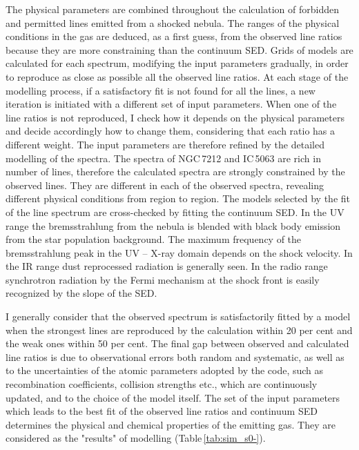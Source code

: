 \documentclass[../thesis.tex]{subfiles}
\begin{document}
The physical parameters are combined throughout the calculation of forbidden and permitted lines emitted from a shocked nebula.
The ranges of the physical conditions in the gas are deduced, as a first guess, from the observed line ratios because they are more constraining than the continuum SED.
Grids of models are calculated for each spectrum, modifying the input parameters gradually, in order to reproduce as close as possible all the observed line ratios.
At each stage of the modelling process, if a satisfactory fit is not found for all the lines, a new iteration is initiated with a different set of input parameters. 
When one of the line ratios is not reproduced, I check how it depends on the physical parameters and decide accordingly how to change them, considering that each ratio has a different weight.
The input parameters are therefore refined by the detailed modelling of the spectra.
The spectra of NGC\,7212 and IC\,5063 are rich in number of lines, therefore the calculated spectra are strongly constrained by the observed lines. 
They are different in each of the observed spectra, revealing different physical conditions from region to region. 
The models selected  by the fit of the line spectrum  are cross-checked by fitting the continuum SED.
In the UV range the bremsstrahlung from the  nebula is blended with black body emission from the star population background. 
The maximum frequency of the bremsstrahlung peak in the UV -- X-ray domain depends on the shock velocity. 
In the IR range dust reprocessed radiation is generally seen.  
In the radio range synchrotron radiation by the Fermi mechanism at the shock front is easily recognized by the slope of the SED.


I generally consider that the observed spectrum is satisfactorily fitted by a model when the strongest lines are
reproduced by the calculation within 20 per cent and the weak ones within 50 per cent.
The final gap between observed and calculated line ratios is due to observational errors both random and systematic, as well as to the uncertainties of the atomic parameters  adopted by the code, such as recombination coefficients, collision strengths etc., which are continuously updated, and to the choice of the model itself.
The set of the input parameters which leads to the best fit of the observed line ratios and continuum SED determines the physical and chemical properties of the emitting gas. 
They are considered as the "results" of modelling (Table\,\ref{tab:sim_s0-}). 
\end{document}
